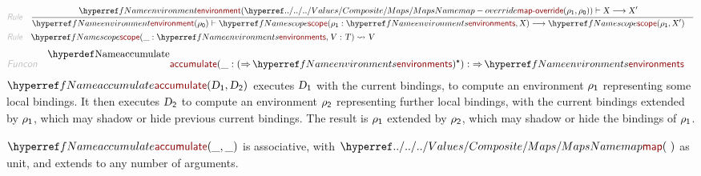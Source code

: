 \begin{align*}
  \KEY{Rule} \quad
    & \RULE{
      & \NAMEREF{environment} (  \NAMEHYPER{../../../Values/Composite}{Maps}{map-override}
                                     (  \VAR{$\rho$}\SUB{1}, 
                                            \VAR{$\rho$}\SUB{0} ) ) \vdash \VAR{X} \TRANS 
          \VAR{X}'
      }{
      & \NAMEREF{environment} (  \VAR{$\rho$}\SUB{0} ) \vdash \NAMEREF{scope}
                      (  \VAR{$\rho$}\SUB{1} : \NAMEREF{environments}, 
                             \VAR{X} ) \TRANS 
          \NAMEREF{scope}
            (  \VAR{$\rho$}\SUB{1}, 
                   \VAR{X}' )
      }
\\
  \KEY{Rule} \quad
    & \NAMEREF{scope}
        (  \_ : \NAMEREF{environments}, 
               \VAR{V} : \VAR{T} ) \leadsto 
        \VAR{V}
\end{align*}
\begin{align*}
  \KEY{Funcon} \quad
  & \NAMEDECL{accumulate}(
                       \_ : (   \TO \NAMEREF{environments} )\STAR) 
    :  \TO \NAMEREF{environments} 
\end{align*}
$\SHADE{\NAMEREF{accumulate}
           (  \VAR{D}\SUB{1}, 
                  \VAR{D}\SUB{2} )}$ executes $\SHADE{\VAR{D}\SUB{1}}$ with the current bindings, to compute an
  environment $\SHADE{\VAR{$\rho$}\SUB{1}}$ representing some local bindings. It then executes $\SHADE{\VAR{D}\SUB{2}}$ to
  compute an environment $\SHADE{\VAR{$\rho$}\SUB{2}}$ representing further local bindings, with the
  current bindings extended by $\SHADE{\VAR{$\rho$}\SUB{1}}$, which may shadow or hide previous
  current bindings. The result is $\SHADE{\VAR{$\rho$}\SUB{1}}$ extended by $\SHADE{\VAR{$\rho$}\SUB{2}}$, which may shadow
  or hide the bindings of $\SHADE{\VAR{$\rho$}\SUB{1}}$.

$\SHADE{\NAMEREF{accumulate}
           (  \_, 
                  \_ )}$ is associative, with $\SHADE{\NAMEHYPER{../../../Values/Composite}{Maps}{map}
           (   \  )}$ as unit, and extends to any
  number of arguments.

